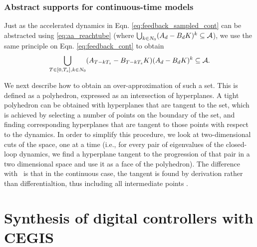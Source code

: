  \subsubsection{Abstract supports for continuous-time models}
 \label{sec:cont_aasup}

Just as the accelerated dynamics in Eqn. \eqref{eq:feedback_sampled_cont} can be abstracted using \eqref{eq:aa_reachtube} (where $\bigcup_{k \in N_0} ({A}_d-{B}_d{K}) ^k \subseteq \mathcal{A}$), 
we use the same principle on Eqn. \eqref{eq:feedback_cont} to obtain 
\begin{equation}\label{eq:aa_cont_amatrix}
\bigcup_{T \in [0, T_s], k \in N_0} ({A}_{T-kT_s}-{B}_{T-kT_s}{K}) ({A}_d-{B}_d{K})^k \subseteq \mathcal{A}.
\end{equation}

We next describe how to obtain an over-approximation of such a set. 
This is defined as a polyhedron, expressed as an intersection of hyperplanes. 
A tight polyhedron can be obtained with hyperplanes that are tangent to the set,  
which is achieved by selecting a number of points on the boundary of the set, 
and finding corresponding hyperplanes that are tangent to those points with respect to the dynamics.  
In order to simplify this procedure, we look at two-dimensional cuts  of the space, one at a time (i.e., for every pair
of eigenvalues of the closed-loop dynamics, we find a hyperplane tangent to
the progression of that pair in a two dimensional space and use it as a face of
the polyhedron).  The difference with~\cite{cattaruzza2015unbounded} is that
in the continuous case, the tangent is found by derivation  rather than
differentialtion, thus including all intermediate points . 


\fi
\section{Synthesis of digital controllers with CEGIS} 
\label{sssec:cegisdig}

